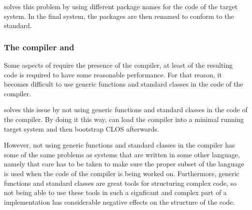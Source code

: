 \sbcl{} solves this problem by using different package names for the
code of the target system.  In the final system, the packages are then
renamed to conform to the standard.

\subsubsection{The compiler and \clos{}}

Some aspects of \clos{} require the presence of the compiler, at least
of the resulting code is required to have some reasonable
performance.  For that reason, it becomes difficult to use generic
functions and standard classes in the code of the compiler.

\sbcl{} solves this issue by not using generic functions and standard
classes in the code of the compiler.  By doing it this way, \sbcl{}
can load the compiler into a minimal running target system and then
bootstrap CLOS afterwards.

However, not using generic functions and standard classes in the
compiler has some of the same problems as \commonlisp{} systems that
are written in some other language, namely that care has to be taken
to make sure the proper subset of the language is used when the code
of the compiler is being worked on.  Furthermore, generic functions
and standard classes are great tools for structuring complex code, so
not being able to use these tools in such a signficant and complex
part of a \commonlisp{} implementation has considerable negative
effects on the structure of the code.
